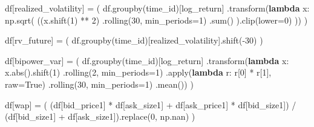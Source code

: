 \documentclass[
  letterpaper,
  DIV=11,
  numbers=noendperiod]{scrartcl}
\newenvironment{Shaded}{\begin{snugshade}}{\end{snugshade}}
\newcommand{\BuiltInTok}[1]{\textcolor[rgb]{0.00,0.23,0.31}{#1}}
\newcommand{\DecValTok}[1]{\textcolor[rgb]{0.68,0.00,0.00}{#1}}
\newcommand{\KeywordTok}[1]{\textcolor[rgb]{0.00,0.23,0.31}{\textbf{#1}}}
\newcommand{\NormalTok}[1]{\textcolor[rgb]{0.00,0.23,0.31}{#1}}
\newcommand{\OperatorTok}[1]{\textcolor[rgb]{0.37,0.37,0.37}{#1}}
\newcommand{\StringTok}[1]{\textcolor[rgb]{0.13,0.47,0.30}{#1}}
\newcommand{\VariableTok}[1]{\textcolor[rgb]{0.07,0.07,0.07}{#1}}
\begin{document}
\begin{Shaded}
\begin{Highlighting}[]
\NormalTok{    df[}\StringTok{\textquotesingle{}realized\_volatility\textquotesingle{}}\NormalTok{] }\OperatorTok{=}\NormalTok{ (}
\NormalTok{        df.groupby(}\StringTok{\textquotesingle{}time\_id\textquotesingle{}}\NormalTok{)[}\StringTok{\textquotesingle{}log\_return\textquotesingle{}}\NormalTok{]}
\NormalTok{        .transform(}\KeywordTok{lambda}\NormalTok{ x: np.sqrt(}
\NormalTok{            ((x.shift(}\DecValTok{1}\NormalTok{) }\OperatorTok{**} \DecValTok{2}\NormalTok{)}
\NormalTok{                .rolling(}\DecValTok{30}\NormalTok{, min\_periods}\OperatorTok{=}\DecValTok{1}\NormalTok{)}
\NormalTok{                .}\BuiltInTok{sum}\NormalTok{()}
\NormalTok{            ).clip(lower}\OperatorTok{=}\DecValTok{0}\NormalTok{)}
\NormalTok{        ))}
\NormalTok{    )}

\NormalTok{    df[}\StringTok{\textquotesingle{}rv\_future\textquotesingle{}}\NormalTok{] }\OperatorTok{=}\NormalTok{ (}
\NormalTok{        df.groupby(}\StringTok{\textquotesingle{}time\_id\textquotesingle{}}\NormalTok{)[}\StringTok{\textquotesingle{}realized\_volatility\textquotesingle{}}\NormalTok{].shift(}\OperatorTok{{-}}\DecValTok{30}\NormalTok{)   }
\NormalTok{    )}

\NormalTok{    df[}\StringTok{\textquotesingle{}bipower\_var\textquotesingle{}}\NormalTok{] }\OperatorTok{=}\NormalTok{ (}
\NormalTok{        df.groupby(}\StringTok{\textquotesingle{}time\_id\textquotesingle{}}\NormalTok{)[}\StringTok{\textquotesingle{}log\_return\textquotesingle{}}\NormalTok{]}
\NormalTok{          .transform(}\KeywordTok{lambda}\NormalTok{ x: x.}\BuiltInTok{abs}\NormalTok{().shift(}\DecValTok{1}\NormalTok{)}
\NormalTok{                       .rolling(}\DecValTok{2}\NormalTok{, min\_periods}\OperatorTok{=}\DecValTok{1}\NormalTok{)}
\NormalTok{                       .}\BuiltInTok{apply}\NormalTok{(}\KeywordTok{lambda}\NormalTok{ r: r[}\DecValTok{0}\NormalTok{] }\OperatorTok{*}\NormalTok{ r[}\DecValTok{1}\NormalTok{], raw}\OperatorTok{=}\VariableTok{True}\NormalTok{)}
\NormalTok{                       .rolling(}\DecValTok{30}\NormalTok{, min\_periods}\OperatorTok{=}\DecValTok{1}\NormalTok{)}
\NormalTok{                       .mean())}
\NormalTok{    )}

\NormalTok{    df[}\StringTok{\textquotesingle{}wap\textquotesingle{}}\NormalTok{] }\OperatorTok{=}\NormalTok{ (}
\NormalTok{        (df[}\StringTok{\textquotesingle{}bid\_price1\textquotesingle{}}\NormalTok{] }\OperatorTok{*}\NormalTok{ df[}\StringTok{\textquotesingle{}ask\_size1\textquotesingle{}}\NormalTok{] }\OperatorTok{+}\NormalTok{ df[}\StringTok{\textquotesingle{}ask\_price1\textquotesingle{}}\NormalTok{] }\OperatorTok{*}\NormalTok{ df[}\StringTok{\textquotesingle{}bid\_size1\textquotesingle{}}\NormalTok{]) }\OperatorTok{/}
\NormalTok{        (df[}\StringTok{\textquotesingle{}bid\_size1\textquotesingle{}}\NormalTok{] }\OperatorTok{+}\NormalTok{ df[}\StringTok{\textquotesingle{}ask\_size1\textquotesingle{}}\NormalTok{]).replace(}\DecValTok{0}\NormalTok{, np.nan)}
\NormalTok{    )}
    

\end{Highlighting}
\end{Shaded}
\end{document}
